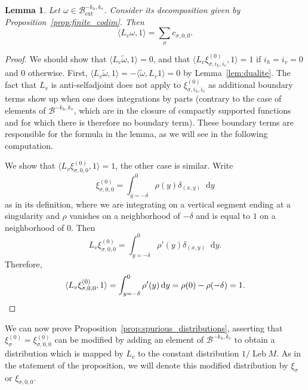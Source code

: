 \documentclass[JEP,XML,SOM,Unicode]{cedram}
\newcommand{\ext}{\mathrm{ext}}
\newcommand{\boB}{\mathcal{B}}
\newcommand{\dd}{\mathop{}\!\mathrm{d}}
\DeclareMathOperator{\Leb}{Leb}
\newtheorem{lem}[thm]{Lemma}
\theoremstyle{definition}
\numberwithin{equation}{section}
\begin{document}
\begin{lem}
\label{lem:duality_ext} Let $\omega \in \boB^{-k_h, k_v}_{\ext}$. Consider its
decomposition given by Proposition~\ref{prop:finite_codim}. Then
\begin{equation*}
\langle L_v \omega, 1 \rangle = \sum_{\sigma} c_{\sigma, 0, 0}.
\end{equation*}
\end{lem}
\begin{proof}
We should show that $\langle L_v \tilde \omega, 1 \rangle = 0$, and that
$\langle L_v\xi^{(0)}_{\sigma, i_h, i_v}, 1\rangle = 1$ if $i_h=i_v=0$ and
$0$ otherwise. First, $\langle L_v \tilde \omega, 1 \rangle = - \langle
\tilde\omega, L_v 1 \rangle = 0$ by Lemma~\ref{lem:dualite}. The fact that
$L_v$ is anti-selfadjoint does not apply to $\xi^{(0)}_{\sigma, i_h, i_v}$ as
additional boundary terms show up when one does integrations by parts
(contrary to the case of elements of $\boB^{-k_h, k_v}$, which are in the
closure of compactly supported functions and for which there is therefore no
boundary term). These boundary terms are responsible for the formula in the
lemma, as we will see in the following computation.

We show that $\langle L_v\xi^{(0)}_{\sigma, 0, 0}, 1\rangle = 1$, the other
case is similar. Write
\[
\xi^{(0)}_{\sigma, 0, 0} = \int_{y=-\delta}^{0}
\rho(y) \delta_{(x,y)} \dd y
\]
as in its definition, where we are integrating
on a vertical segment ending at a singularity and $\rho$ vanishes on a
neighborhood of $-\delta$ and is equal to $1$ on a neighborhood of $0$. Then
\[
L_v \xi^{(0)}_{\sigma, 0, 0} = \int_{y=-\delta}^{0} \rho'(y) \delta_{(x,y)}
\dd y.
\]
Therefore,
\begin{equation*}
\langle L_v \xi^{(0)}_{\sigma, 0, 0}, 1 \rangle = \int_{y=-\delta}^{0} \rho'(y) \dd y
= \rho (0) - \rho(-\delta) = 1.
\qedhere
\end{equation*}
\end{proof}

We can now prove Proposition~\ref{prop:spurious_distributions}, asserting
that $\xi^{(0)}_\sigma = \xi^{(0)}_{\sigma, 0, 0}$ can be modified by adding
an element of $\boB^{-k_h, k_v}$ to obtain a distribution which is mapped by
$L_v$ to the constant distribution $1/\Leb M$. As in the statement of the
proposition, we will denote this modified distribution by $\xi_\sigma$ or
$\xi_{\sigma,0,0}$.
\end{document}
